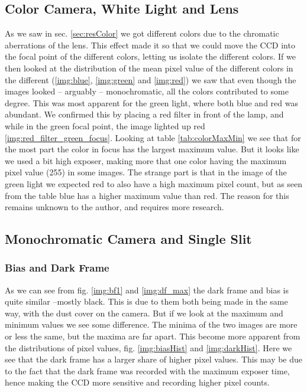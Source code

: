 \documentclass{emulateapj}
\begin{document}
\subsection{Color Camera, White Light and Lens}
As we saw in sec. \ref{sec:resColor} we got different colors due to the chromatic aberrations of the lens. This effect made it so that we could move the CCD into the focal point of the different colors, letting us isolate the different colors. If we then looked at the distribution of the mean pixel value of the different colors in the different (\ref{img:blue}, \ref{img:green} and \ref{img:red}) we saw that even though the images looked -- arguably -- monochromatic, all the colors contributed to some degree. This was most apparent for the green light, where both blue and red was abundant. We confirmed this by placing a red filter in front of the lamp, and while in the green focal point, the image lighted up red \ref{img:red_filter_green_focus}. Looking at table \ref{tab:colorMaxMin} we see that for the most part the color in focus has the largest maximum value. But it looks like we used a bit high exposer, making more that one color having the maximum pixel value (255) in some images. The strange part is that in the image of the green light we expected red to also have a high maximum pixel count, but as seen from the table blue has a higher maximum value than red. The reason for this remains unknown to the author, and requires more research.

\subsection{Monochromatic Camera and Single Slit}
\subsubsection{Bias and Dark Frame}
As we can see from fig. \ref{img:bf1} and \ref{img:df_max} the dark frame and bias is quite similar --mostly black. This is due to them both being made in the same way, with the dust cover on the camera. But if we look at the maximum and minimum values we see some difference. The minima of the two images are more or less the same, but the maxima are far apart. This become more apparent from the distributions of pixel values, fig. \ref{img:biasHist} and \ref{img:darkHist}. Here we see that the dark frame has a larger share of higher pixel values. This may be due to the fact that the dark frame was recorded with the maximum exposer time, hence making the CCD more sensitive and recording higher pixel counts.
\end{document}
